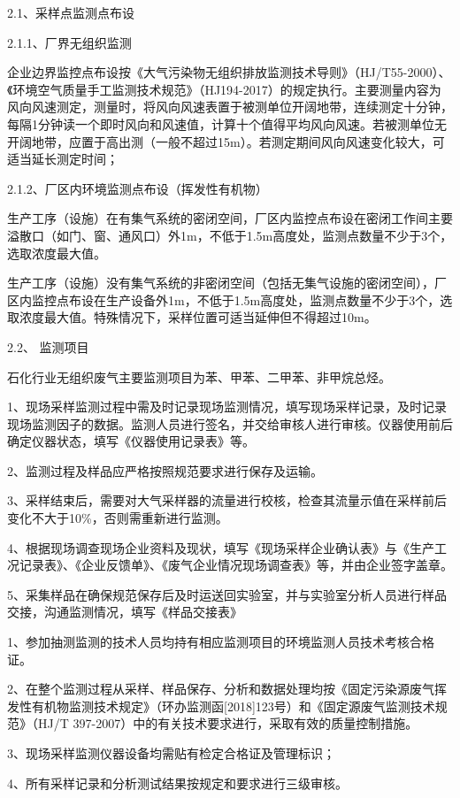 \documentclass[
]{book}
\begin{document}
2.1、采样点监测点布设

2.1.1、厂界无组织监测

企业边界监控点布设按《大气污染物无组织排放监测技术导则》（HJ/T55-2000）、《环境空气质量手工监测技术规范》（HJ194-2017）的规定执行。主要测量内容为风向风速测定，测量时，将风向风速表置于被测单位开阔地带，连续测定十分钟，每隔1分钟读一个即时风向和风速值，计算十个值得平均风向风速。若被测单位无开阔地带，应置于高出测（一般不超过15m）。若测定期间风向风速变化较大，可适当延长测定时间；

2.1.2、厂区内环境监测点布设（挥发性有机物）

生产工序（设施）在有集气系统的密闭空间，厂区内监控点布设在密闭工作间主要溢散口（如门、窗、通风口）外1m，不低于1.5m高度处，监测点数量不少于3个，选取浓度最大值。

生产工序（设施）没有集气系统的非密闭空间（包括无集气设施的密闭空间），厂区内监控点布设在生产设备外1m，不低于1.5m高度处，监测点数量不少于3个，选取浓度最大值。特殊情况下，采样位置可适当延伸但不得超过10m。

2.2、 监测项目

石化行业无组织废气主要监测项目为苯、甲苯、二甲苯、非甲烷总烃。

1、现场采样监测过程中需及时记录现场监测情况，填写现场采样记录，及时记录现场监测因子的数据。监测人员进行签名，并交给审核人进行审核。仪器使用前后确定仪器状态，填写《仪器使用记录表》等。

2、监测过程及样品应严格按照规范要求进行保存及运输。

3、采样结束后，需要对大气采样器的流量进行校核，检查其流量示值在采样前后变化不大于10\%，否则需重新进行监测。

4、根据现场调查现场企业资料及现状，填写《现场采样企业确认表》与《生产工况记录表》、《企业反馈单》、《废气企业情况现场调查表》等，并由企业签字盖章。

5、采集样品在确保规范保存后及时运送回实验室，并与实验室分析人员进行样品交接，沟通监测情况，填写《样品交接表》

1、参加抽测监测的技术人员均持有相应监测项目的环境监测人员技术考核合格证。

2、在整个监测过程从采样、样品保存、分析和数据处理均按《固定污染源废气挥发性有机物监测技术规定》（环办监测函{[}2018{]}123号）和《固定源废气监测技术规范》（HJ/T 397-2007）中的有关技术要求进行，采取有效的质量控制措施。

3、现场采样监测仪器设备均需贴有检定合格证及管理标识；

4、所有采样记录和分析测试结果按规定和要求进行三级审核。
\end{document}
